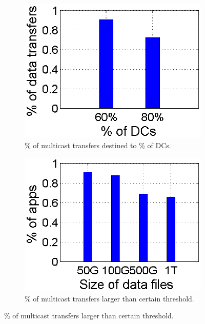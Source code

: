 \begin{figure}[t]
        \centering
        \begin{subfigure}[b]{0.23\textwidth}
                \centering
                \includegraphics[width=\textwidth]{images/destinationDC.eps}%
                \caption{\% of multicast transfers destined to \% of DCs.}
                \label{fig:bulk:dest}
        \end{subfigure}
	\hspace{0.1cm}
        \begin{subfigure}[b]{0.23\textwidth}
                \centering
                \includegraphics[width=\textwidth]{images/DataSize.eps}
                \caption{\% of multicast transfers larger than certain threshold.}
                \label{fig:bulk:size}
        \end{subfigure}
        \vspace{-0.4cm}
        \label{fig:bulk}
\vspace{-0.4cm}
\end{figure}

